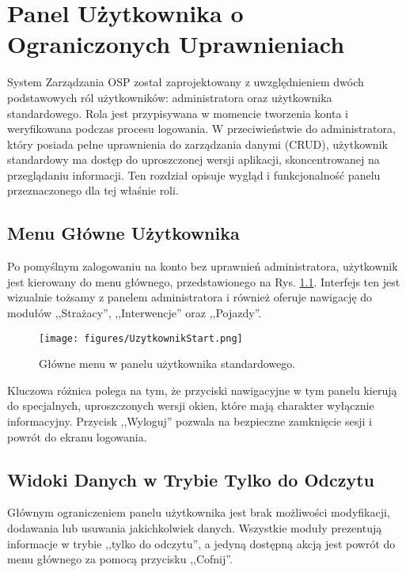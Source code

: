 \chapter{Panel Użytkownika o Ograniczonych Uprawnieniach}
\label{chap:panel_uzytkownika}

System Zarządzania OSP został zaprojektowany z uwzględnieniem dwóch podstawowych ról użytkowników: administratora oraz użytkownika standardowego. Rola jest przypisywana w momencie tworzenia konta i weryfikowana podczas procesu logowania. W przeciwieństwie do administratora, który posiada pełne uprawnienia do zarządzania danymi (CRUD), użytkownik standardowy ma dostęp do uproszczonej wersji aplikacji, skoncentrowanej na przeglądaniu informacji. Ten rozdział opisuje wygląd i funkcjonalność panelu przeznaczonego dla tej właśnie roli.

\section{Menu Główne Użytkownika}
\label{sec:menu_uzytkownika}

Po pomyślnym zalogowaniu na konto bez uprawnień administratora, użytkownik jest kierowany do menu głównego, przedstawionego na Rys. \ref{fig:uzytkownik_start}. Interfejs ten jest wizualnie tożsamy z panelem administratora i również oferuje nawigację do modułów ,,Strażacy'', ,,Interwencje'' oraz ,,Pojazdy''.

\begin{figure}[H]
	\centering
	\texttt{[image: figures/UzytkownikStart.png]}
	\caption{Główne menu w panelu użytkownika standardowego.}
	\label{fig:uzytkownik_start}
\end{figure}

Kluczowa różnica polega na tym, że przyciski nawigacyjne w tym panelu kierują do specjalnych, uproszczonych wersji okien, które mają charakter wyłącznie informacyjny. Przycisk ,,Wyloguj'' pozwala na bezpieczne zamknięcie sesji i powrót do ekranu logowania.

\section{Widoki Danych w Trybie Tylko do Odczytu}
\label{sec:widoki_readonly}

Głównym ograniczeniem panelu użytkownika jest brak możliwości modyfikacji, dodawania lub usuwania jakichkolwiek danych. Wszystkie moduły prezentują informacje w trybie ,,tylko do odczytu'', a jedyną dostępną akcją jest powrót do menu głównego za pomocą przycisku ,,Cofnij''.

